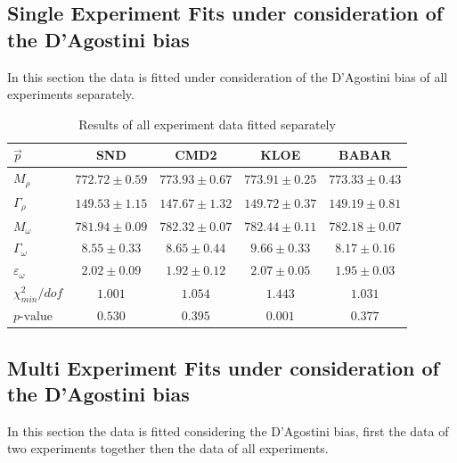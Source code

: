 \documentclass[a4paper]{article}
\begin{document}
\newpage
\subsection{Single Experiment Fits under consideration of the D'Agostini bias}
In this section the data is fitted under consideration of the D'Agostini bias of all experiments separately.
\begin{table}[h!]
    \caption{Results of all experiment data fitted separately}
    \centering
    \begin{tabular}{|l|c|c|c|c|}
        \hline
        $\vec{p}$ & SND & CMD2 & KLOE & BABAR \\ \hline
        $M_{\rho}$              & $772.72	\pm 0.59$ & $773.93	\pm 0.67$ &$773.91	\pm 0.25 $&$773.33	\pm 0.43$ \\
        $\Gamma_{\rho}$         & $149.53	\pm 1.15$ & $147.67	\pm 1.32$ &$149.72	\pm 0.37 $&$149.19	\pm 0.81$\\
        $M_{\omega}$            & $781.94	\pm 0.09$ & $782.32	\pm 0.07$ &$782.44	\pm 0.11 $&$782.18	\pm 0.07$\\
        $\Gamma_{\omega}$       & $8.55	\pm 0.33    $ & $8.65	\pm 0.44$ &$9.66	\pm 0.33 $&$8.17	\pm 0.16$\\
        $\varepsilon_{\omega}$  & $2.02	\pm 0.09    $ & $1.92	\pm 0.12$ &$2.07	\pm 0.05 $&$1.95	\pm 0.03$\\
        \hline
        $\chi^2_{min}/dof$      & $1.001$&$ 1.054$&$ 1.443$&$ 1.031$\\
        $p\text{-value}$        & $0.530$&$ 0.395$&$ 0.001$&$ 0.377$\\
        \hline
    \end{tabular}
\end{table}

\subsection{Multi Experiment Fits under consideration of the D'Agostini bias}
In this section the data is fitted considering the D'Agostini bias, first the data of
two experiments together then the data of all experiments.
\end{document}
